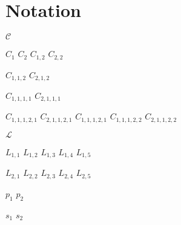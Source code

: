 \chapter{Notation}
\label{cha:Notation}

$\mathcal{C}$

$C_1$
$C_2$
$C_{1,2}$
$C_{2,2}$

$C_{1,1,2}$
$C_{2,1,2}$

$C_{1,1,1,1}$
$C_{2,1,1,1}$

$C_{1,1,1,2,1}$
$C_{2,1,1,2,1}$
$C_{1,1,1,2,1}$
$C_{1,1,1,2,2}$
$C_{2,1,1,2,2}$

$\mathcal{L}$

$L_{1,1}$
$L_{1,2}$
$L_{1,3}$
$L_{1,4}$
$L_{1,5}$

$L_{2,1}$
$L_{2,2}$
$L_{2,3}$
$L_{2,4}$
$L_{2,5}$

$p_1$
$p_2$

$s_1$
$s_2$